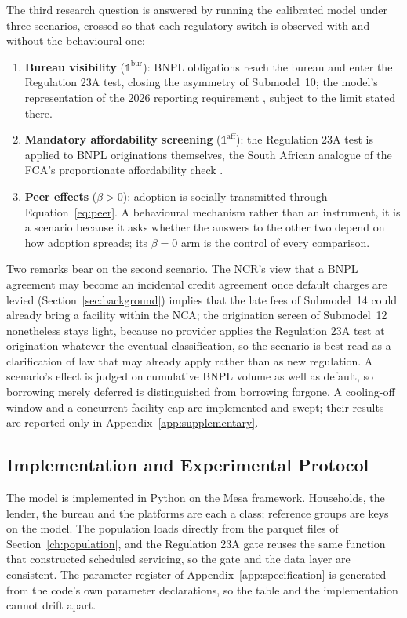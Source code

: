 The third research question is answered by running the calibrated model under three scenarios, crossed so that each regulatory switch is observed with and without the behavioural one:
\begin{enumerate}
\item \textbf{Bureau visibility} ($\mathbb{1}^{\text{bur}}$): \ac{BNPL} obligations reach the bureau and enter the Regulation 23A test, closing the asymmetry of Submodel~10; the model's representation of the 2026 reporting requirement \cite{businessday_bnpl_2026}, subject to the limit stated there.
\item \textbf{Mandatory affordability screening} ($\mathbb{1}^{\text{aff}}$): the Regulation 23A test is applied to \ac{BNPL} originations themselves, the South African analogue of the \ac{FCA}'s proportionate affordability check \cite{fca_ps26_1, woolard2021}.
\item \textbf{Peer effects} ($\beta > 0$): adoption is socially transmitted through Equation~\ref{eq:peer}. A behavioural mechanism rather than an instrument, it is a scenario because it asks whether the answers to the other two depend on how adoption spreads; its $\beta = 0$ arm is the control of every comparison.
\end{enumerate}
Two remarks bear on the second scenario.
The \ac{NCR}'s view that a \ac{BNPL} agreement may become an incidental credit agreement once default charges are levied (Section~\ref{sec:background}) implies that the late fees of Submodel~14 could already bring a facility within the \ac{NCA}; the origination screen of Submodel~12 nonetheless stays light, because no provider applies the Regulation 23A test at origination whatever the eventual classification, so the scenario is best read as a clarification of law that may already apply rather than as new regulation.
A scenario's effect is judged on cumulative \ac{BNPL} volume as well as default, so borrowing merely deferred is distinguished from borrowing forgone.
A cooling-off window and a concurrent-facility cap are implemented and swept; their results are reported only in Appendix~\ref{app:supplementary}.

\subsection{Implementation and Experimental Protocol}
\label{sec:implementation}

The model is implemented in Python on the Mesa framework.
Households, the lender, the bureau and the platforms are each a class; reference groups are keys
on the model.
The population loads directly from the parquet files of
Section~\ref{ch:population}, and the Regulation 23A gate reuses the same function that
constructed scheduled servicing, so the gate and the data layer are consistent.
The parameter register of Appendix~\ref{app:specification} is generated from the code's own parameter declarations, so the table and the implementation cannot drift apart.

